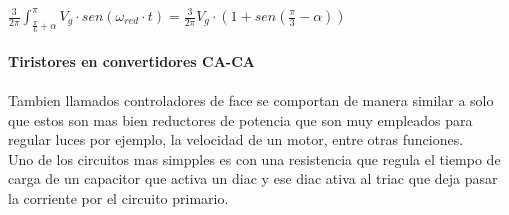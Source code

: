 \documentclass[letterpaper]{article}
\begin{document}
\begin{large}
\begin{large}
\begin{figure}[htbp]
                    \label{fig:my_lab55el}
                \end{figure}\newpage
                \textbf{$\frac{3}{2\pi}\int ^{\pi}_{\frac{\pi}{6}+\alpha}V_g \cdot sen(\omega_{red}\cdot t)=\frac{3}{2\pi}V_g \cdot(1+sen(\frac{\pi}{3}-\alpha))$}\\\\
            \textbf{Tiristores en convertidores CA-CA}\\\\
            Tambien llamados controladores de face se comportan de manera similar a solo que estos son mas bien reductores de potencia que son muy empleados para regular luces por ejemplo, la velocidad de un motor, entre otras funciones.\\
            Uno de los circuitos mas simpples es con una resistencia que regula el tiempo de carga de un capacitor que activa un diac y ese diac ativa al triac que deja pasar la corriente por el circuito primario.
        \end{large}
    \end{large}
    
    
\end{document}
